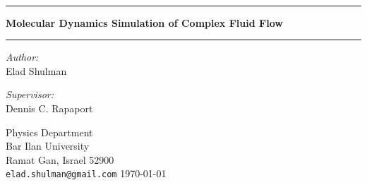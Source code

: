 \begin{titlepage}
\begin{center}
\\[0.5cm]
\hrule
{ \vspace{2 mm} }
{ \huge \bfseries Molecular Dynamics Simulation of Complex Fluid Flow } {
\vspace{3 mm} }
\hrule
{ \vspace{8 mm} }
\begin{minipage}{0.4\textwidth}
\begin{flushleft} \large
\emph{Author:}\\
Elad Shulman
\end{flushleft}
\end{minipage}
\begin{minipage}{0.4\textwidth}
\begin{flushleft} \large
\emph{Supervisor:} \\
Dennis C. Rapaport
\end{flushleft}
\end{minipage}
\vfill
\large{Physics Department\\
Bar Ilan University\\
Ramat Gan, Israel 52900\\
\tt\small elad.shulman@gmail.com}
\vfill
\today
\end{center}
\end{titlepage}